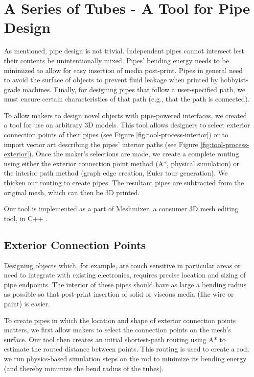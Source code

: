 \section{A Series of Tubes - A Tool for Pipe Design}

As mentioned, pipe design is not trivial.  Independent pipes cannot intersect lest their contents be unintentionally mixed.  Pipes' bending energy needs to be minimized to allow for easy insertion of media post-print.  Pipes in general need to avoid the surface of objects to prevent fluid leakage when printed by hobbyist-grade machines.  Finally, for designing pipes that follow a user-specified path, we must ensure certain characteristics of that path (e.g., that the path is connected).

To allow makers to design novel objects with pipe-powered interfaces, we created a tool for use on arbitrary 3D models.  This tool allows designers to select exterior connection points of their pipes (see Figure \ref{fig:tool-process-interior}) or to import vector art describing the pipes' interior paths (see Figure \ref{fig:tool-process-exterior}).  Once the maker's selections are made, we create a complete routing using either the exterior connection point method (A*, physical simulation) or the interior path method (graph edge creation, Euler tour generation).  We thicken our routing to create pipes.   The resultant pipes are subtracted from the original mesh, which can then be 3D printed.

Our tool is implemented as a part of Meshmixer, a consumer 3D mesh editing tool, in C++ \cite{Schmidt-meshmixer}.

\subsection{Exterior Connection Points}

Designing objects which, for example, are touch sensitive in particular areas or need to integrate with existing electronics, requires precise location and sizing of pipe endpoints.  The interior of these pipes should have as large a bending radius as possible so that post-print insertion of solid or viscous media (like wire or paint) is easier.

To create pipes in which the location and shape of exterior connection points matters, we first allow makers to select the connection points on the mesh's surface. Our tool then creates an initial shortest-path routing using A* to estimate the routed distance between points.  This routing is used to create a rod; we run physics-based simulation steps on the rod to minimize its bending energy (and thereby minimize the bend radius of the tubes).

